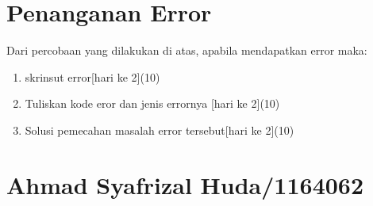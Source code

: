 \section{Penanganan Error}
Dari percobaan yang dilakukan di atas, apabila mendapatkan error maka:

\begin{enumerate}
	\item
	skrinsut error[hari ke 2](10)
	\item
Tuliskan kode eror dan jenis errornya [hari ke 2](10)
	\item
Solusi pemecahan masalah error tersebut[hari ke 2](10)

\end{enumerate}

\section{Ahmad Syafrizal Huda/1164062}
